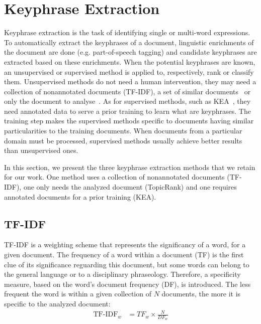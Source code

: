 \section{Keyphrase Extraction}
\label{sec:keyphrase_extraction}
  Keyphrase extraction is the task of identifying single or multi-word
  expressions. To automatically extract the keyphrases of a document,
  linguistic enrichments of the document are done (e.g. part-of-speech tagging)
  and candidate keyphrases are extracted based on these enrichments. When the
  potential keyphrases are known, an unsupervised or supervised method is
  applied to, respectively, rank or classify them. Unsupervised methods do not
  need a human intervention, they may need a collection of nonannotated
  documents (TF-IDF), a set of similar
  documents~\cite[ExpandRank]{wan2008expandrank} or only the document to
  analyse~\cite[TopicRank]{bougouin2013topicrank}. As for supervised methods,
  such as KEA~\cite{witten1999kea}, they need annotated data to serve a prior
  training to learn what are keyphrases. The training step makes the supervised
  methods specific to documents having similar particularities to the training
  documents. When documents from a particular domain must be processed,
  supervised methods usually achieve better results than unsupervised ones.

  In this section, we present the three keyphrase extraction methods that we
  retain for our work. One method uses a collection of nonannotated documents
  (TF-IDF), one only needs the analyzed document (TopicRank) and one requires
  annotated documents for a prior training (KEA).

  \subsection{TF-IDF}
  \label{subsec:tfidf}
    TF-IDF is a weighting scheme that represents the significancy of a word, for
    a given document. The frequency of a word within a document (TF) is the
    first clue of its significance reguarding this document, but some words can
    belong to the general language or to a disciplinary phraseology. Therefore,
    a specificity measure, based on the word's document frequency (DF), is
    introduced. The less frequent the word is within a given collection of $N$
    documents, the more it is specific to the analyzed document:
    \begin{align}
      \text{TF-IDF}_w &= TF_w \times \frac{N}{DF_w}
    \end{align}

